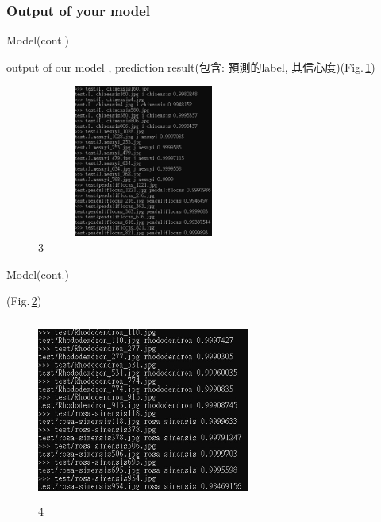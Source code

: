 \documentclass{beamer}
\begin{document}
\subsubsection{Output of your model}
\begin{frame}{Model(cont.)}
  \begin{CJK}{UTF8}{bkai}
output of our model , prediction result(包含: 預測的label, 其信心度)(Fig.\,\ref{fig:3})
  \end{CJK}
    \begin{figure}
      \includegraphics[width=7cm,height=5cm]{output(1).jpg}
      \caption{3}
      \label{fig:3}
    \end{figure}
\end{frame}

\begin{frame}{Model(cont.)}
  \begin{CJK}{UTF8}{bkai}
(Fig.\,\ref{fig:4})
  \end{CJK}
    \begin{figure}
      \includegraphics[width=7cm,height=6cm]{output(2).jpg}
      \caption{4}
      \label{fig:4}
    \end{figure}
\end{frame}
\end{document}
